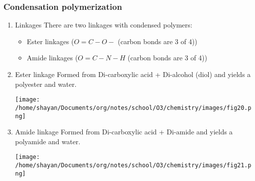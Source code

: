 \documentclass[11pt]{article}
\begin{document}
\subsubsection{Condensation polymerization}
\label{sec:org7c9af24}
\begin{enumerate}
\item Linkages
\label{sec:org638b7d9}
There are two linkages with condensed polymers:
\begin{itemize}
\item Ester linkages (\(O=C-O-\) (carbon bonds are 3 of 4))
\item Amide linkages (\(O=C-N-H\) (carbon bonds are 3 of 4))
\end{itemize}
\item Ester linkage
\label{sec:org9bb2db9}
Formed from Di-carboxylic acid + Di-alcohol (diol) and yields a polyester and water.
\begin{center}
\texttt{[image: /home/shayan/Documents/org/notes/school/O3/chemistry/images/fig20.png]}
\end{center}
\item Amide linkage
\label{sec:org35509c5}
Formed from Di-carboxylic acid + Di-amide and yields a polyamide and water.
\begin{center}
\texttt{[image: /home/shayan/Documents/org/notes/school/O3/chemistry/images/fig21.png]}
\end{center}
\end{enumerate}
\end{document}
